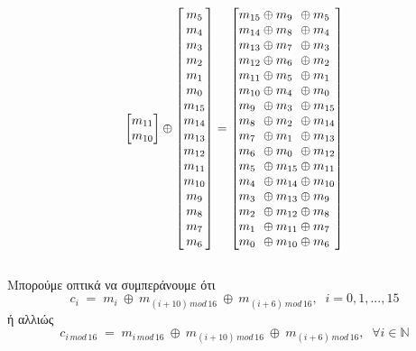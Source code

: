 \documentclass[12pt]{article}
\newcommand{\xor}{\ensuremath{\oplus}}
\newcommand{\nul}{\ensuremath{\hphantom{*}}}
\begin{document}
\begin{align*}
\begin{bmatrix}
m_{11} \\
m_{10} \\
\end{bmatrix} \xor
\begin{bmatrix}
m_{5} \\
m_{4} \\
m_{3} \\
m_{2} \\
m_{1} \\
m_{0} \\ 
m_{15} \\
m_{14} \\
m_{13} \\
m_{12} \\
m_{11} \\
m_{10} \\
m_{9} \\
m_{8} \\
m_{7} \\
m_{6} \\
\end{bmatrix} = 
\begin{bmatrix}
m_{15} \xor m_{9\nul} \xor m_{5\nul} \\
m_{14} \xor m_{8\nul} \xor m_{4\nul} \\
m_{13} \xor m_{7\nul} \xor m_{3\nul} \\
m_{12} \xor m_{6\nul} \xor m_{2\nul} \\
m_{11} \xor m_{5\nul} \xor m_{1\nul} \\
m_{10} \xor m_{4\nul} \xor m_{0\nul} \\
m_{9\nul} \xor m_{3\nul} \xor m_{15} \\
m_{8\nul} \xor m_{2\nul} \xor m_{14} \\
m_{7\nul} \xor m_{1\nul} \xor m_{13} \\
m_{6\nul} \xor m_{0\nul} \xor m_{12} \\
m_{5\nul} \xor m_{15} \xor m_{11} \\
m_{4\nul} \xor m_{14} \xor m_{10} \\
m_{3\nul} \xor m_{13} \xor m_{9\nul} \\
m_{2\nul} \xor m_{12} \xor m_{8\nul} \\
m_{1\nul} \xor m_{11} \xor m_{7\nul} \\
m_{0\nul} \xor m_{10} \xor m_{6\nul} \\
\end{bmatrix}
\end{align*} \\
Μπορούμε οπτικά να συμπεράνουμε ότι
{\large
\[
c_{i}\;=\;m_{i}\:\xor\:m_{(i+10)\,mod\,16}\:\xor\:m_{(i+6)\,mod\,16},\;\; i=0, 1, ..., 15
\]
}
ή αλλιώς 
{\large
\[
c_{i\,mod\,16}\;=\;m_{i\,mod\,16}\:\xor\:m_{(i+10)\,mod\,16}\:\xor\:m_{(i+6)\,mod\,16},\;\; \forall i \in \mathbb{N}
\]
}
\end{document}
